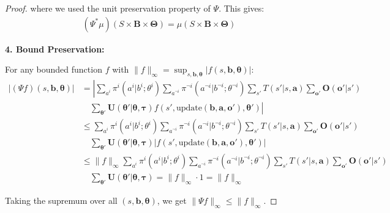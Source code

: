 \begin{proof}
    where we used the unit preservation property of $\Psi$. This gives:
    \begin{align}
        (\Psi^{*}\mu)(S \times \boldsymbol{B}\times \boldsymbol{\Theta}) = \mu(S \times \boldsymbol{B}\times \boldsymbol{\Theta})
    \end{align}

    \textbf{4. Bound Preservation:}

    For any bounded function $f$ with
    $\|f\|_{\infty}= \sup_{s,\boldsymbol{b},\boldsymbol{\theta}}|f(s,\boldsymbol{b}
        ,\boldsymbol{\theta})|$:
    \begin{align}
        |(\Psi f)(s, \boldsymbol{b}, \boldsymbol{\theta})| & = \left| \sum_{a^i}\pi^{i}(a^{i}|b^{i}; \theta^{i}) \sum_{a^{\neg i}}\pi^{\neg i}(a^{\neg i}|b^{\neg i}; \theta^{\neg i}) \sum_{s'}T(s'|s, \boldsymbol{a}) \sum_{\boldsymbol{o}'}\boldsymbol{O}(\boldsymbol{o}'|s') \right.   \\
                                                           & \quad \left. \sum_{\boldsymbol{\theta}'}\boldsymbol{U}(\boldsymbol{\theta}'|\boldsymbol{\theta}, \boldsymbol{\tau}) f(s', \text{update}(\boldsymbol{b}, \boldsymbol{a}, \boldsymbol{o}'), \boldsymbol{\theta}') \right|       \\
                                                           & \leq \sum_{a^i}\pi^{i}(a^{i}|b^{i}; \theta^{i}) \sum_{a^{\neg i}}\pi^{\neg i}(a^{\neg i}|b^{\neg i}; \theta^{\neg i}) \sum_{s'}T(s'|s, \boldsymbol{a}) \sum_{\boldsymbol{o}'}\boldsymbol{O}(\boldsymbol{o}'|s')               \\
                                                           & \quad \sum_{\boldsymbol{\theta}'}\boldsymbol{U}(\boldsymbol{\theta}'|\boldsymbol{\theta}, \boldsymbol{\tau}) \left|f(s', \text{update}(\boldsymbol{b}, \boldsymbol{a}, \boldsymbol{o}'), \boldsymbol{\theta}') \right|        \\
                                                           & \leq \|f\|_{\infty}\sum_{a^i}\pi^{i}(a^{i}|b^{i}; \theta^{i}) \sum_{a^{\neg i}}\pi^{\neg i}(a^{\neg i}|b^{\neg i}; \theta^{\neg i}) \sum_{s'}T(s'|s, \boldsymbol{a}) \sum_{\boldsymbol{o}'}\boldsymbol{O}(\boldsymbol{o}'|s') \\
                                                           & \quad \sum_{\boldsymbol{\theta}'}\boldsymbol{U}(\boldsymbol{\theta}'|\boldsymbol{\theta}, \boldsymbol{\tau}) = \|f\|_{\infty}\cdot 1 = \|f\|_{\infty}
    \end{align}

    Taking the supremum over all $(s, \boldsymbol{b}, \boldsymbol{\theta})$, we get
    $\|\Psi f\|_{\infty}\leq \|f\|_{\infty}$.


\end{proof}
